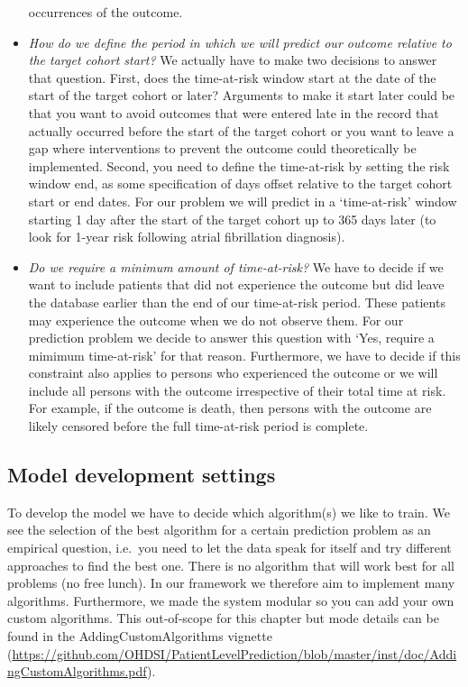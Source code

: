 \documentclass[]{book}
\begin{document}
\begin{itemize}
  occurrences of the outcome.
\item
  \emph{How do we define the period in which we will predict our outcome
  relative to the target cohort start?} We actually have to make two
  decisions to answer that question. First, does the time-at-risk window
  start at the date of the start of the target cohort or later?
  Arguments to make it start later could be that you want to avoid
  outcomes that were entered late in the record that actually occurred
  before the start of the target cohort or you want to leave a gap where
  interventions to prevent the outcome could theoretically be
  implemented. Second, you need to define the time-at-risk by setting
  the risk window end, as some specification of days offset relative to
  the target cohort start or end dates. For our problem we will predict
  in a `time-at-risk' window starting 1 day after the start of the
  target cohort up to 365 days later (to look for 1-year risk following
  atrial fibrillation diagnosis).
\item
  \emph{Do we require a minimum amount of time-at-risk?} We have to
  decide if we want to include patients that did not experience the
  outcome but did leave the database earlier than the end of our
  time-at-risk period. These patients may experience the outcome when we
  do not observe them. For our prediction problem we decide to answer
  this question with `Yes, require a mimimum time-at-risk' for that
  reason. Furthermore, we have to decide if this constraint also applies
  to persons who experienced the outcome or we will include all persons
  with the outcome irrespective of their total time at risk. For
  example, if the outcome is death, then persons with the outcome are
  likely censored before the full time-at-risk period is complete.
\end{itemize}

\subsection{Model development
settings}\label{model-development-settings}

To develop the model we have to decide which algorithm(s) we like to
train. We see the selection of the best algorithm for a certain
prediction problem as an empirical question, i.e.~you need to let the
data speak for itself and try different approaches to find the best one.
There is no algorithm that will work best for all problems (no free
lunch). In our framework we therefore aim to implement many algorithms.
Furthermore, we made the system modular so you can add your own custom
algorithms. This out-of-scope for this chapter but mode details can be
found in the AddingCustomAlgorithms vignette
(\url{https://github.com/OHDSI/PatientLevelPrediction/blob/master/inst/doc/AddingCustomAlgorithms.pdf}).
\end{document}
